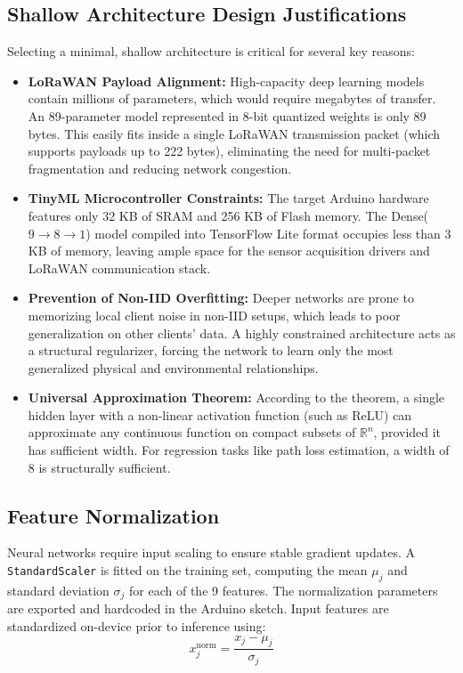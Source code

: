 \subsection{Shallow Architecture Design Justifications}
Selecting a minimal, shallow architecture is critical for several key reasons:
\begin{itemize}
    \item \textbf{LoRaWAN Payload Alignment:} High-capacity deep learning models contain millions of parameters, which would require megabytes of transfer. An 89-parameter model represented in 8-bit quantized weights is only 89 bytes. This easily fits inside a single LoRaWAN transmission packet (which supports payloads up to 222 bytes), eliminating the need for multi-packet fragmentation and reducing network congestion.
    \item \textbf{TinyML Microcontroller Constraints:} The target Arduino hardware features only 32 KB of SRAM and 256 KB of Flash memory. The Dense($9{\to}8{\to}1$) model compiled into TensorFlow Lite format occupies less than 3 KB of memory, leaving ample space for the sensor acquisition drivers and LoRaWAN communication stack.
    \item \textbf{Prevention of Non-IID Overfitting:} Deeper networks are prone to memorizing local client noise in non-IID setups, which leads to poor generalization on other clients' data. A highly constrained architecture acts as a structural regularizer, forcing the network to learn only the most generalized physical and environmental relationships.
    \item \textbf{Universal Approximation Theorem:} According to the theorem, a single hidden layer with a non-linear activation function (such as ReLU) can approximate any continuous function on compact subsets of $\mathbb{R}^n$, provided it has sufficient width. For regression tasks like path loss estimation, a width of 8 is structurally sufficient.
\end{itemize}

\subsection{Feature Normalization}
Neural networks require input scaling to ensure stable gradient updates. A \texttt{StandardScaler} is fitted on the training set, computing the mean $\mu_j$ and standard deviation $\sigma_j$ for each of the 9 features. The normalization parameters are exported and hardcoded in the Arduino sketch. Input features are standardized on-device prior to inference using:
\begin{equation}
    x^{\text{norm}}_j = \frac{x_j - \mu_j}{\sigma_j}
\end{equation}

